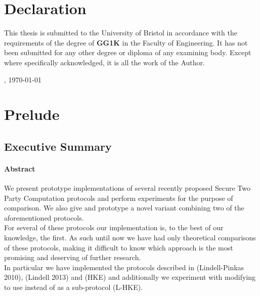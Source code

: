 \documentclass[ %
                    author={Nicholas Tutte},
                supervisor={Prof. Nigel Smart},
                    degree={MEng},
                     title={Secure Two Party Computation},
                  subtitle={A practical comparison of recent protocols},
                      type={Research - GG1K},
                      year={2015} ]{dissertation}
\begin{document}

	\maketitle
	\chapter*{Declaration}

		This thesis is submitted to the University of Bristol in accordance 
		with the requirements of the degree of \textbf{GG1K} in the Faculty 
		of Engineering.  It has not been submitted for any other degree or diploma 
		of any examining body.  Except where specifically acknowledged, it is all 
		the work of the Author. 

		\vspace{6cm}

		, \today


	\chapter*{Prelude}
		\section*{Executive Summary}
			\subsubsection*{Abstract}
			  We present prototype implementations of several recently proposed Secure Two Party Computation protocols and perform experiments for the purpose of comparison. We also give and prototype a novel variant combining two of the aforementioned protocols.\\

			  For several of these protocols our implementation is, to the best of our knowledge, the first. As such until now we have had only theoretical comparisons of these protocols, making it difficult to know which approach is the most promising and deserving of further research.\\

			  In particular we have implemented the protocols described in \cite{LindellAndPinkas2011} (Lindell-Pinkas 2010), \cite{Lindell_CnC_2013} (Lindell 2013) and \cite{Katz_Symm_CnC_2013} (HKE) and additionally we experiment with modifying \cite{Lindell_CnC_2013} to use \cite{Katz_Symm_CnC_2013} instead of \cite{LindellAndPinkas2011} as a sub-protocol (L-HKE).\\
\end{document}
